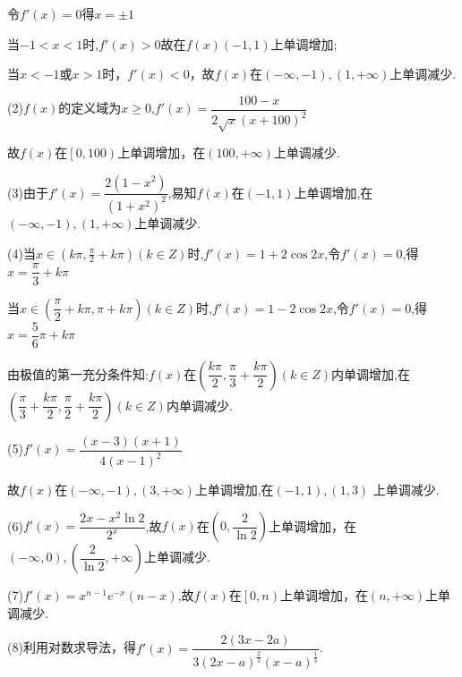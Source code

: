 令${f' }\left( x \right) = 0$得$x =  \pm 1$

当$ - 1 < x < 1$时,$f' \left( x \right) > 0$故在$f\left( x \right)\left( { - 1,1} \right)$上单调增加;

当$x <  - 1$或$x > 1$时，$f'\left( x \right) < 0$，故$f(x)$在$\left( { - \infty , - 1} \right),\left( {1, + \infty } \right)$上单调减少.

(2)$f\left( x \right)$的定义域为$x \ge 0$,$f'\left( x \right) = \dfrac{{100 - x}}{{2\sqrt x {{\left( {x + 100} \right)}^2}}}$

故$f\left( x \right)$在$\left[ {0,100} \right)$上单调增加，在$\left( {100, + \infty } \right)$上单调减少.

(3)由于$f'\left( x \right) = \dfrac{{2\left( {1 - {x^2}} \right)}}{{{{\left( {1 + {x^2}} \right)}^2}}}$,易知$f\left( x \right)$在$\left( { - 1,1} \right)$上单调增加,在$\left( { - \infty , - 1} \right),\left( {1, + \infty } \right)$上单调减少.

(4)当$x \in \left( {k\pi ,\frac{\pi }{2} + k\pi } \right)\left( {k \in Z} \right)$时,$f'\left( x \right) = 1 + 2\cos 2x$,令$f'\left( x \right) = 0$,得$x = \dfrac{\pi }{3} + k\pi $

当$x \in \left( {\dfrac{\pi }{2} + k\pi ,\pi  + k\pi } \right)\left( {k \in Z} \right)$时,$f'\left( x \right) = 1 - 2\cos 2x$,令$f'\left( x \right) = 0$,得$x = \dfrac{5}{6}\pi  + k\pi $

由极值的第一充分条件知:$f(x)$在$\left( {\dfrac{{k\pi }}{2},\dfrac{\pi }{3} + \dfrac{{k\pi }}{2}} \right)\left( {k \in Z} \right)$内单调增加,在$\left( {\dfrac{\pi }{3} + \dfrac{{k\pi }}{2},\dfrac{\pi }{2} + \dfrac{{k\pi }}{2}} \right)\left( {k \in Z} \right)$内单调减少.

(5)$f'\left( x \right) = \dfrac{{\left( {x - 3} \right)\left( {x + 1} \right)}}{{4{{\left( {x - 1} \right)}^2}}}$

故$f(x)$在$\left( { - \infty , - 1} \right),\left( {3, + \infty } \right)$上单调增加,在$\left( { - 1,1} \right),\left( {1,3} \right)$
上单调减少.

(6)$f'\left( x \right) = \dfrac{{2x - {x^2}\ln 2}}{{{2^x}}}$,故$f(x)$在$\left( {0,\dfrac{2}{{\ln 2}}} \right)$上单调增加，在$\left( { - \infty ,0} \right),\left( {\dfrac{2}{{\ln 2}}, + \infty } \right)$上单调减少.

(7)$f'\left( x \right) = {x^{n - 1}}{e^{ - x}}\left( {n - x} \right)$,故$f(x)$在$\left[ {0,n} \right)$上单调增加，在$\left( {n, + \infty } \right)$上单调减少.

(8)利用对数求导法，得$f'\left( x \right) = \dfrac{{2\left( {3x - 2a} \right)}}{{3{{\left( {2x - a} \right)}^{\frac{2}{3}}}{{\left( {x - a} \right)}^{\frac{1}{3}}}}}$.

